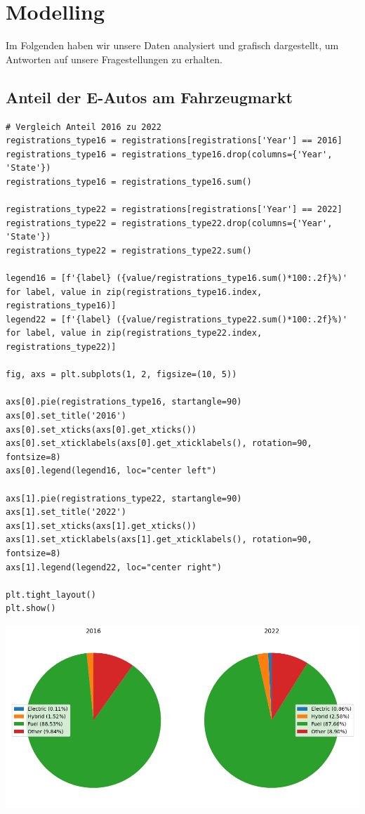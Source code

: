 \section{Modelling}

Im Folgenden haben wir unsere Daten analysiert und grafisch dargestellt, um Antworten auf unsere Fragestellungen zu erhalten.

\subsection{Anteil der E-Autos am Fahrzeugmarkt}

\begin{verbatim}
# Vergleich Anteil 2016 zu 2022
registrations_type16 = registrations[registrations['Year'] == 2016]
registrations_type16 = registrations_type16.drop(columns={'Year', 'State'})
registrations_type16 = registrations_type16.sum()

registrations_type22 = registrations[registrations['Year'] == 2022]
registrations_type22 = registrations_type22.drop(columns={'Year', 'State'})
registrations_type22 = registrations_type22.sum()

legend16 = [f'{label} ({value/registrations_type16.sum()*100:.2f}%)' for label, value in zip(registrations_type16.index, registrations_type16)]
legend22 = [f'{label} ({value/registrations_type22.sum()*100:.2f}%)' for label, value in zip(registrations_type22.index, registrations_type22)]

fig, axs = plt.subplots(1, 2, figsize=(10, 5))

axs[0].pie(registrations_type16, startangle=90)
axs[0].set_title('2016')
axs[0].set_xticks(axs[0].get_xticks())
axs[0].set_xticklabels(axs[0].get_xticklabels(), rotation=90, fontsize=8)
axs[0].legend(legend16, loc="center left")

axs[1].pie(registrations_type22, startangle=90)
axs[1].set_title('2022')
axs[1].set_xticks(axs[1].get_xticks())
axs[1].set_xticklabels(axs[1].get_xticklabels(), rotation=90, fontsize=8)
axs[1].legend(legend22, loc="center right")

plt.tight_layout()
plt.show()
\end{verbatim}

\begin{center}
\includegraphics[scale=0.5]{img/output_1_0.png}
\end{center}

